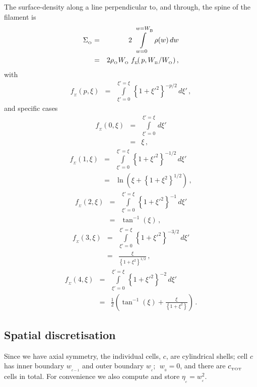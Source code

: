 \documentclass[usenatbib]{mn2e}
\newcommand{\subB}{_{_{\rm B}}}
\newcommand{\subO}{_{_{\rm O}}}
\numberwithin{equation}{section}
\begin{document}
The surface-density along a line perpendicular to, and through, the spine of the filament is
\begin{eqnarray}\nonumber
\Sigma\subO&=&2\,\int\limits_{w=0}^{w=W\subB}\,\rho(w)\,dw\\\label{EQN:SigmaFIL}
&=&2\rho\subO W\subO\;f_{_\Sigma}\!(\,p,W\subB/W\subO)\,,
\end{eqnarray}
with
\begin{eqnarray}
f_{_\Sigma}\!(p,\xi)&=&\int\limits_{\xi'=0}^{\xi'=\xi}\,\left\{1+\xi'^2\right\}^{-p/2}\,d\xi'\,,
\end{eqnarray}
and specific cases
\begin{eqnarray}\nonumber
f_{_\Sigma}(0,\xi)&=&\int\limits_{\xi'=0}^{\xi'=\xi}\,d\xi'\\
&=&\xi\,,
\end{eqnarray}
\begin{eqnarray}\nonumber
f_{_\Sigma}(1,\xi)&=&\int\limits_{\xi'=0}^{\xi'=\xi}\,\left\{1+\xi'^2\right\}^{-1/2}\,d\xi'\\
&=&\ln\left(\xi+\left\{1+\xi^2\right\}^{1/2}\right)\,,
\end{eqnarray}
\begin{eqnarray}\nonumber
f_{_\Sigma}(2,\xi)&=&\int\limits_{\xi'=0}^{\xi'=\xi}\,\left\{1+\xi'^2\right\}^{-1}\,d\xi'\\
&=&\tan^{-1}(\xi)\,,
\end{eqnarray}
\begin{eqnarray}\nonumber
f_{_\Sigma}(3,\xi)&=&\int\limits_{\xi'=0}^{\xi'=\xi}\,\left\{1+\xi'^2\right\}^{-3/2}\,d\xi'\\
&=&\frac{\xi}{\left\{1+\xi^2\right\}^{1/2}}\,,
\end{eqnarray}
\begin{eqnarray}\nonumber
f_{_\Sigma}(4,\xi)&=&\int\limits_{\xi'=0}^{\xi'=\xi}\,\left\{1+\xi'^2\right\}^{-2}\,d\xi'\\
&=&\frac{1}{2}\left(\!\tan^{-1}(\xi)+\frac{\xi}{\left\{1+\xi^2\right\}}\!\right)\,.
\end{eqnarray}

\subsection{Spatial discretisation}

Since we have axial symmetry, the individual cells, $c$, are cylindrical shells; cell $c$ has inner boundary $w_{_{c-1}}$ and outer boundary $w_{_c}$; $\;w_{_0}\!=\!0$, and there are $c_{_{\rm TOT}}$ cells in total. For convenience we also compute and store $\eta_{_c}\!=\!w_{_c}^2$. 
\end{document}
